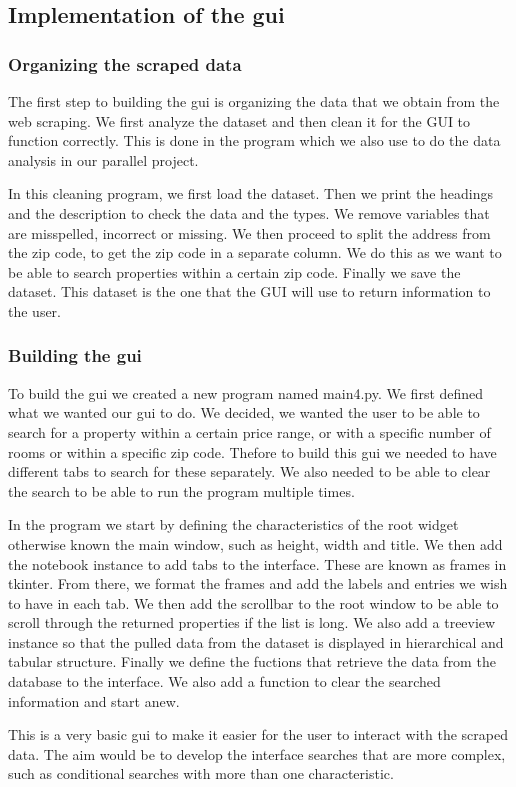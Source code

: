 \documentclass[main]{subfiles}
\begin{document}
\subsection{Implementation of the \ac{gui}}

\subsubsection{Organizing the scraped data}
The first step to building the \ac{gui} is organizing the data that we obtain from the web scraping.
We first analyze the dataset and then clean it for the GUI to function correctly.
This is done in the program  which we also use to do the data analysis in our parallel project. \par
In this cleaning program, we first load the dataset. 
Then we print the headings and the description to check the data and the types.
We remove variables that are misspelled, incorrect or missing. 
We then proceed to split the address from the zip code, to get the zip code in a separate column. 
We do this as we want to be able to search properties within a certain zip code. 
Finally we save the dataset. This dataset is the one that the GUI will use to return information to the user.

\vspace*{5pt}
\subsubsection{Building the \ac{gui}}

To build the \ac{gui} we created a new program named main4.py.
We first defined what we wanted our \ac{gui} to do. 
We decided, we wanted the user to be able to search for a property within a certain price range, 
or with a specific number of rooms or within a specific zip code. 
Thefore to build this \ac{gui} we needed to have different tabs to search for these separately.
We also needed to be able to clear the search to be able to run the program multiple times. \par
In the program we start by defining the characteristics of the root widget otherwise known the main window,
such as height, width and title. We then add the notebook instance to add tabs to the interface.
These are known as frames in tkinter. From there, we format the frames and add the labels and entries we wish to have in each tab. 
We then add the scrollbar to the root window to be able to scroll through the returned properties if the list is long. 
We also add a treeview instance so that the pulled data from the dataset is displayed in hierarchical and tabular structure. 
Finally we define the fuctions that retrieve the data from the database to the interface. 
We also add a function to clear the searched information and start anew. \par
This is a very basic \ac{gui} to make it easier for the user to interact with the scraped data.
The aim would be to develop the interface searches that are more complex, such as conditional searches with more than one characteristic.
\end{document}
